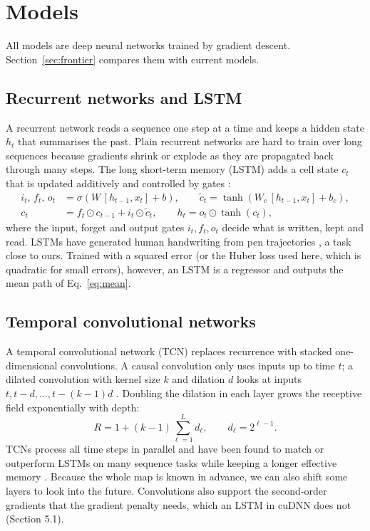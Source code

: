 \documentclass[11pt,a4paper]{article}
\begin{document}
\section{Models}
All models are deep neural networks trained by gradient descent. Section~\ref{sec:frontier} compares them
with current models.

\subsection{Recurrent networks and LSTM}
A recurrent network reads a sequence one step at a time and keeps a hidden state $h_t$ that summarises the
past. Plain recurrent networks are hard to train over long sequences because gradients shrink or explode as
they are propagated back through many steps. The long short-term memory (LSTM) adds a cell state $c_t$ that
is updated additively and controlled by gates \citep{hochreiter1997, gers2000}:
\begin{align}
  i_t,\,f_t,\,o_t &= \sigma\left(W\,[h_{t-1},x_t] + b\right), \qquad
  \tilde c_t = \tanh\left(W_c\,[h_{t-1},x_t] + b_c\right),\\
  c_t &= f_t\odot c_{t-1} + i_t\odot \tilde c_t, \qquad h_t = o_t\odot\tanh(c_t),
\end{align}
where the input, forget and output gates $i_t, f_t, o_t$ decide what is written, kept and read. LSTMs have
generated human handwriting from pen trajectories \citep{graves2013}, a task close to ours. Trained with a
squared error (or the Huber loss used here, which is quadratic for small errors), however, an LSTM is a
regressor and outputs the mean path of Eq.~\eqref{eq:mean}.

\subsection{Temporal convolutional networks}
A temporal convolutional network (TCN) replaces recurrence with stacked one-dimensional convolutions. A
causal convolution only uses inputs up to time $t$; a dilated convolution with kernel size $k$ and dilation
$d$ looks at inputs $t, t-d, \dots, t-(k-1)d$ \citep{yu2016, oord2016}. Doubling the dilation in each layer
grows the receptive field exponentially with depth:
\begin{equation}
  R = 1 + (k-1)\sum_{\ell=1}^{L} d_\ell, \qquad d_\ell = 2^{\ell-1}.
\end{equation}
TCNs process all time steps in parallel and have been found to match or outperform LSTMs on many sequence
tasks while keeping a longer effective memory \citep{bai2018}. Because the whole map is known in advance, we
can also shift some layers to look into the future. Convolutions also support the second-order gradients
that the gradient penalty needs, which an LSTM in cuDNN does not (Section 5.1).
\end{document}
